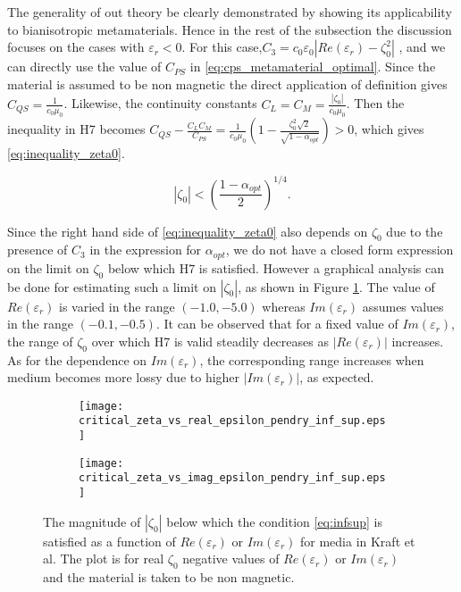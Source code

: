 The generality of out theory be clearly demonstrated by showing its 
applicability to bianisotropic metamaterials. 
Hence in the rest of the subsection the discussion  focuses on 
the cases with $\varepsilon_r < 0$.
For this case,$C_3 = c_0\varepsilon_0 |Re(\varepsilon_r) -\zeta_0^2|$ , and we can directly use the value of $C_{PS}$ in \eqref{eq:cps_metamaterial_optimal}.
Since the material is assumed to be non magnetic the direct application of definition 
gives $C_{QS} = \frac{1}{c_0\mu_0}$.
Likewise, the continuity constants $C_L = C_M = \frac{|\zeta_0|}{c_0\mu_0}$.
Then the inequality in H7 becomes $C_{QS} -\frac{C_L C_M}{C_{PS}} = \frac{1}{c_0\mu_0}(1 -\frac{\zeta_0^2\sqrt{2}}{\sqrt{1-\alpha_{opt}}}) > 0$, 
which gives \eqref{eq:inequality_zeta0}.

\begin{equation} \label{eq:inequality_zeta0}
|\zeta_0| < \left(\frac{1 - \alpha_{opt}}{2}\right)^{1/4}.
\end{equation}

Since the right hand side of \eqref{eq:inequality_zeta0} also depends on 
$\zeta_0$ due to the presence of $C_3$ in the expression for $\alpha_{opt}$,
we do not have a closed form expression on the limit on $\zeta_0$ 
below which H7 is satisfied.
However a graphical analysis can be done for estimating such a limit 
on $|\zeta_0|$, as shown in 
Figure \ref{fi:critical_zeta_vs_epsilonr_inf_sup}.
The value of $Re(\varepsilon_r)$ is varied in the range $(-1.0,-5.0)$ 
whereas $Im(\varepsilon_r)$ assumes values in the range $(-0.1,-0.5)$.
It can be observed that for a fixed value of $Im(\varepsilon_r)$, 
the range of $\zeta_0$ over which H7 is valid steadily decreases as 
$|Re(\varepsilon_r)|$ increases. 
As for the dependence on $Im(\varepsilon_r)$, the corresponding range
increases when medium becomes more lossy due to higher $|Im(\varepsilon_r)|$,
as expected.

\begin{figure}[H]
\centering
\begin{subfigure}[b]{0.49\textwidth}
\texttt{[image: critical\_zeta\_vs\_real\_epsilon\_pendry\_inf\_sup.eps]}
\end{subfigure}
%
\begin{subfigure}[b]{0.49\textwidth}
\centering
\texttt{[image: critical\_zeta\_vs\_imag\_epsilon\_pendry\_inf\_sup.eps]}
\end{subfigure}
\caption{The magnitude of $|\zeta_0|$ below which the condition \ref{eq:infsup} is satisfied as a function of $Re(\varepsilon_r)$ or $Im(\varepsilon_r)$ for media in Kraft et al.
The plot is for real $\zeta_0$ negative values of  $Re(\varepsilon_r)$ or $Im(\varepsilon_r)$ and the material is taken to be non magnetic.}
\label{fi:critical_zeta_vs_epsilonr_inf_sup}
\end{figure}

